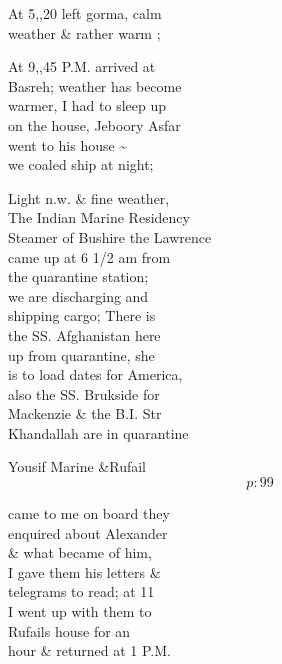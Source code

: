 \documentclass{report}
\begin{document}
	\par{
 	At 5,,20 left gorma, calm\ \\weather \& rather warm ;\ \\
	}

	\par{
 	At 9,,45 P.M. arrived at\ \\Basreh; weather has become\ \\warmer, I had to sleep up\ \\on the house, Jeboory Asfar\ \\went to his house \~{}\ \\we coaled ship at night;\ \\
	}

	\par{
 	Light n.w. \& fine weather,\ \\The Indian Marine Residency\ \\Steamer of Bushire the Lawrence\ \\came up at 6 1/2 am from\ \\the quarantine station;\ \\we are discharging and\ \\shipping cargo; There is\ \\the SS. Afghanistan here\ \\up from quarantine, she\ \\is to load dates for America,\ \\also the SS. Brukside for\ \\Mackenzie \& the B.I. Str\ \\Khandallah are in quarantine\ \\
	}

	\par{
 	Yousif Marine \&Rufail\ \\
  \[p: 99 \]

	}



	\par{
 	came to me on board they\ \\enquired about Alexander\ \\\& what became of him,\ \\I gave them his letters \&\ \\telegrams to read; at 11\ \\I went up with them to\ \\Rufails house for an\ \\hour \& returned at 1 P.M.\ \\
	}
\end{document}
